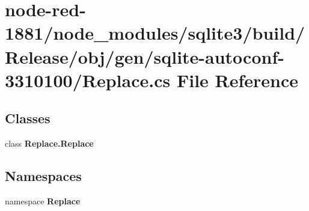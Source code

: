 \section{node-\/red-\/1881/node\+\_\+modules/sqlite3/build/\+Release/obj/gen/sqlite-\/autoconf-\/3310100/\+Replace.cs File Reference}
\label{_replace_8cs}
\subsection*{Classes}
\begin{DoxyCompactItemize}
\item 
class {\bfseries Replace.\+Replace}
\end{DoxyCompactItemize}
\subsection*{Namespaces}
\begin{DoxyCompactItemize}
\item 
namespace \textbf{ Replace}
\end{DoxyCompactItemize}
